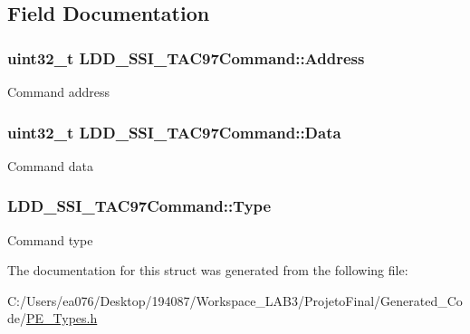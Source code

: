 \subsection{Field Documentation}
\hypertarget{struct_l_d_d___s_s_i___t_a_c97_command_a0d39df5cae85e73b036af81e9fbc6332}{
\subsubsection[{Address}]{\setlength{\rightskip}{0pt plus 5cm}uint32\-\_\-t L\-D\-D\-\_\-\-S\-S\-I\-\_\-\-T\-A\-C97\-Command\-::\-Address}}\label{struct_l_d_d___s_s_i___t_a_c97_command_a0d39df5cae85e73b036af81e9fbc6332}
Command address \hypertarget{struct_l_d_d___s_s_i___t_a_c97_command_abc16535d09d61f2c3f885adf91632117}{
\subsubsection[{Data}]{\setlength{\rightskip}{0pt plus 5cm}uint32\-\_\-t L\-D\-D\-\_\-\-S\-S\-I\-\_\-\-T\-A\-C97\-Command\-::\-Data}}\label{struct_l_d_d___s_s_i___t_a_c97_command_abc16535d09d61f2c3f885adf91632117}
Command data \hypertarget{struct_l_d_d___s_s_i___t_a_c97_command_ac7226beaf57a764f71faf7e822e27a6e}{
\subsubsection[{Type}]{ L\-D\-D\-\_\-\-S\-S\-I\-\_\-\-T\-A\-C97\-Command\-::\-Type}}\label{struct_l_d_d___s_s_i___t_a_c97_command_ac7226beaf57a764f71faf7e822e27a6e}
Command type 

The documentation for this struct was generated from the following file\-:\begin{DoxyCompactItemize}
\item 
C\-:/\-Users/ea076/\-Desktop/194087/\-Workspace\-\_\-\-L\-A\-B3/\-Projeto\-Final/\-Generated\-\_\-\-Code/\hyperlink{_p_e___types_8h}{P\-E\-\_\-\-Types.\-h}\end{DoxyCompactItemize}
